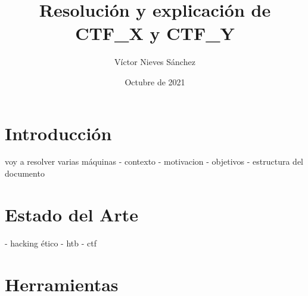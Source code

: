 \documentclass[a4paper, 12pt]{article} %
\author{Víctor Nieves Sánchez}
\date{Octubre de 2021}
\title{Resolución y explicación de CTF\_X y CTF\_Y}
\begin{document}
\maketitle
\null
\newpage
\begin{otherlanguage}{spanish}



    \newpage
    \tableofcontents

    \newpage
    \listoffigures

    \newpage
    \renewcommand{\listtablename}{Lista de Tablas}
    \listoftables

    \newpage
    \lstlistoflistings

    \newpage
    \printglossary[type=\acronymtype]

    \newpage
    \begin{abstract}
        \normalsize
        
    \end{abstract}

    \newpage
        \renewcommand{\spanishabstractname}{Abstract}
        \begin{abstract}
            \normalsize
            
        \end{abstract}
    \newpage

    \section{Introducción}
        voy a resolver varias máquinas
        - contexto
        - motivacion
        - objetivos
        - estructura del documento
    
    \newpage
    \section{Estado del Arte}
    - hacking ético
    - htb
    - ctf
    
    \newpage
    \section{Herramientas}
    

\end{otherlanguage}
\end{document}
